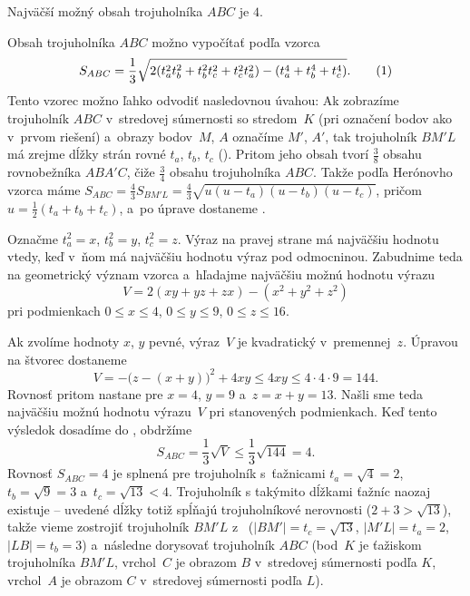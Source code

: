 {\odpoved
Najväčší možný obsah trojuholníka $ABC$ je $4$.

\goodbreak
\ineriesenie
Obsah trojuholníka $ABC$ možno vypočítať podľa vzorca
$$
S_{ABC}=\frac13\sqrt{2(t_a^2t_b^2+t_b^2t_c^2+t_c^2t_a^2)-(t_a^4+t_b^4+t_c^4)}.\tag1
$$
Tento vzorec možno ľahko odvodiť nasledovnou úvahou: Ak zobrazíme trojuholník $ABC$ v~stredovej súmernosti so stredom~$K$ (pri označení bodov ako v~prvom riešení) a~obrazy bodov~$M$, $A$ označíme $M'$, $A'$, tak trojuholník $BM'L$ má zrejme dĺžky strán rovné $t_a$, $t_b$, $t_c$ (\obr). Pritom jeho obsah tvorí $\frac38$ obsahu rovnobežníka $ABA'C$, čiže $\frac34$ obsahu trojuholníka $ABC$. Takže podľa Herónovho vzorca máme $S_{ABC}=\frac43S_{BM'L}=\frac43\sqrt{u(u-t_a)(u-t_b)(u-t_c)}$, pričom $u=\frac12(t_a+t_b+t_c)$, a~po úprave dostaneme .
%

Označme $t_a^2=x$, $t_b^2=y$, $t_c^2=z$. Výraz na pravej strane  má najväčšiu hodnotu vtedy, keď v~ňom má najväčšiu hodnotu výraz pod odmocninou. Zabudnime teda na geometrický význam vzorca a~hľadajme najväčšiu možnú hodnotu výrazu
$$
V=2(xy+yz+zx)-(x^2+y^2+z^2)
$$
pri podmienkach $0\le x\le 4$, $0\le y\le 9$, $0\le z\le 16$.

Ak zvolíme hodnoty $x$, $y$ pevné, výraz~$V$ je kvadratický v~premennej~$z$. Úpravou na štvorec dostaneme
$$
V=-\bigl(z-(x+y)\bigr)^2+4xy\le 4xy\le4\cdot4\cdot9=144.
$$
Rovnosť pritom nastane pre $x=4$, $y=9$ a~$z=x+y=13$. Našli sme teda najväčšiu možnú hodnotu výrazu~$V$ pri stanovených podmienkach. Keď tento výsledok dosadíme do , obdržíme
$$
S_{ABC}=\frac13\sqrt{V}\le\frac13\sqrt{144}=4.
$$
Rovnosť $S_{ABC}=4$ je splnená pre trojuholník s~ťažnicami $t_a=\sqrt{4}=2$, $t_b=\sqrt{9}=3$ a~$t_c=\sqrt{13}<4$. Trojuholník s takýmito dĺžkami ťažníc naozaj existuje -- uvedené dĺžky totiž spĺňajú trojuholníkové nerovnosti ($2+3>\sqrt{13}$), takže vieme zostrojiť trojuholník $BM'L$ z~ ($|BM'|=t_c=\sqrt{13}$, $|M'L|=t_a=2$, $|LB|=t_b=3$) a~následne dorysovať trojuholník $ABC$ (bod~$K$ je ťažiskom trojuholníka $BM'L$, vrchol~$C$ je obrazom $B$ v~stredovej súmernosti podľa $K$, vrchol~$A$ je obrazom $C$ v~stredovej súmernosti podľa $L$).
}

